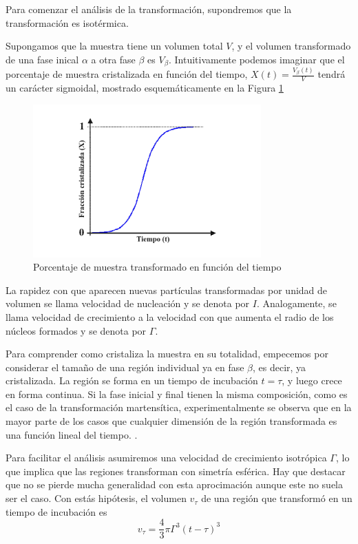 \documentclass[12pt]{article}
\theoremstyle{definition}
\theoremstyle{remark}
\begin{document}
Para comenzar el análisis de la transformación, supondremos que la transformación es isotérmica.

Supongamos que la muestra tiene un volumen total $V$, y el volumen transformado de una fase inical $\alpha$ a otra fase $\beta$ es $V_\beta$. Intuitivamente podemos imaginar que el porcentaje de muestra cristalizada en función del tiempo, $X(t) = \frac{V_\beta (t)}{V}$ tendrá un carácter sigmoidal, mostrado esquemáticamente en la Figura \ref{cvst}

 \begin{figure}[H]
 	\centering
	\includegraphics[scale=0.5]{img/cristalization_vs_tiempo.png}
 	\caption{Porcentaje de muestra transformado en función del tiempo}
	\label{cvst}
\end{figure} 

La rapidez con que aparecen nuevas partículas transformadas por unidad de volumen se llama velocidad de nucleación y se denota por $I$. Analogamente, se llama velocidad de crecimiento a la velocidad con que aumenta el radio de los núcleos formados y se denota por $\Gamma$.

Para comprender como cristaliza la muestra en su totalidad, empecemos por
considerar el tamaño de una región individual ya en fase $\beta$, es decir, ya cristalizada. La región se forma en un tiempo de incubación $t=\tau$, y luego crece en forma continua. Si la fase inicial y final tienen la misma composición, como es el caso de la transformación martensítica, experimentalmente se observa que en la mayor parte de los casos que cualquier dimensión de la región transformada es una función lineal del tiempo. .

Para facilitar el análisis asumiremos una velocidad de crecimiento isotrópica $\Gamma$, lo que implica que las regiones transforman con simetría esférica. Hay que destacar que no se pierde mucha generalidad con esta aprocimación aunque este no suela ser el caso. Con estás hipótesis, el volumen $v_\tau$ de una región que transformó en un tiempo de incubación es 
\begin{equation}
	v_\tau = \frac{4}{3}\pi \Gamma^3(t-\tau)^3
\end{equation}
\end{document}
